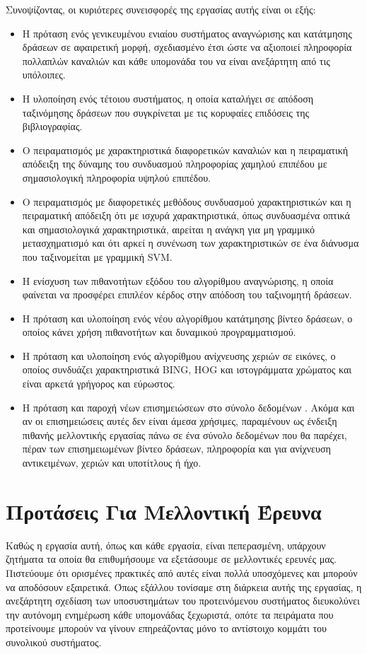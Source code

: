 \documentclass[11pt,a4paper,english,greek,twoside]{../Thesis}
\begin{document}
\par Συνοψίζοντας, οι κυριότερες συνεισφορές της εργασίας αυτής είναι οι εξής:
\begin{itemize}
	\item Η πρόταση ενός γενικευμένου ενιαίου συστήματος αναγνώρισης και κατάτμησης δράσεων σε αφαιρετική μορφή, σχεδιασμένο έτσι ώστε να αξιοποιεί πληροφορία πολλαπλών καναλιών και κάθε υπομονάδα του να είναι ανεξάρτητη από τις υπόλοιπες.
	\item Η υλοποίηση ενός τέτοιου συστήματος, η οποία καταλήγει σε απόδοση ταξινόμησης δράσεων που συγκρίνεται με τις κορυφαίες επιδόσεις της βιβλιογραφίας.
	\item Ο πειραματισμός με χαρακτηριστικά διαφορετικών καναλιών και η πειραματική απόδειξη της δύναμης του συνδυασμού πληροφορίας χαμηλού επιπέδου με σημασιολογική πληροφορία υψηλού επιπέδου.
	\item Ο πειραματισμός με διαφορετικές μεθόδους συνδυασμού χαρακτηριστικών και η πειραματική απόδειξη ότι με ισχυρά χαρακτηριστικά, όπως συνδυασμένα οπτικά και σημασιολογικά χαρακτηριστικά, αιρείται η ανάγκη για μη γραμμικό μετασχηματισμό και ότι αρκεί η συνένωση των χαρακτηριστικών σε ένα διάνυσμα που ταξινομείται με γραμμική SVM.
	\item Η ενίσχυση των πιθανοτήτων εξόδου του αλγορίθμου αναγνώρισης, η οποία φαίνεται να προσφέρει επιπλέον κέρδος στην απόδοση του ταξινομητή δράσεων.
	\item Η πρόταση και υλοποίηση ενός νέου αλγορίθμου κατάτμησης βίντεο δράσεων, ο οποίος κάνει χρήση πιθανοτήτων και δυναμικού προγραμματισμού.
	\item Η πρόταση και υλοποίηση ενός αλγορίθμου ανίχνευσης χεριών σε εικόνες, ο οποίος συνδυάζει χαρακτηριστικά BING, HOG και ιστογράμματα χρώματος και είναι αρκετά γρήγορος και εύρωστος.
	\item Η πρόταση και παροχή νέων επισημειώσεων στο σύνολο δεδομένων \cite{rohrbach_2012}. Ακόμα και αν οι επισημειώσεις αυτές δεν είναι άμεσα χρήσιμες, παραμένουν ως ένδειξη πιθανής μελλοντικής εργασίας πάνω σε ένα σύνολο δεδομένων που θα παρέχει, πέραν των επισημειωμένων βίντεο δράσεων, πληροφορία και για ανίχνευση αντικειμένων, χεριών και υποτίτλους ή ήχο.
\end{itemize}


\section{Προτάσεις Για Μελλοντική Έρευνα}
Καθώς η εργασία αυτή, όπως και κάθε εργασία, είναι πεπερασμένη, υπάρχουν ζητήματα τα οποία θα επιθυμήσουμε να εξετάσουμε σε μελλοντικές ερευνές μας. Πιστεύουμε ότι ορισμένες πρακτικές από αυτές είναι πολλά υποσχόμενες και μπορούν να αποδόσουν εξαιρετικά. Όπως εξάλλου τονίσαμε στη διάρκεια αυτής της εργασίας, η ανεξάρτητη σχεδίαση των υποσυστημάτων του προτεινόμενου συστήματος διευκολύνει την αυτόνομη ενημέρωση κάθε υπομονάδας ξεχωριστά, οπότε τα πειράματα που προτείνουμε μπορούν να γίνουν επηρεάζοντας μόνο το αντίστοιχο κομμάτι του συνολικού συστήματος.
\end{document}
